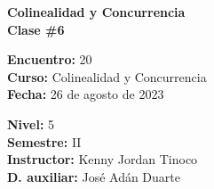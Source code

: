\begin{center} \textbf
{
    \Large Colinealidad y Concurrencia \\ \vspace{2mm}Clase \#6
}
\end{center}

\begin{multicols}{2}
{
    \textbf{Encuentro:} 20\\
    \textbf{Curso:} Colinealidad y Concurrencia\\
    \textbf{Fecha:} 26 de agosto de 2023\\
    \begin{flushright}
        \textbf{Nivel:} 5\\
        \textbf{Semestre:} II\\
        \textbf{Instructor:} Kenny Jordan Tinoco\\
        \textbf{D. auxiliar: }José Adán Duarte
    \end{flushright}
}
\end{multicols}

\thispagestyle{first-page-style}